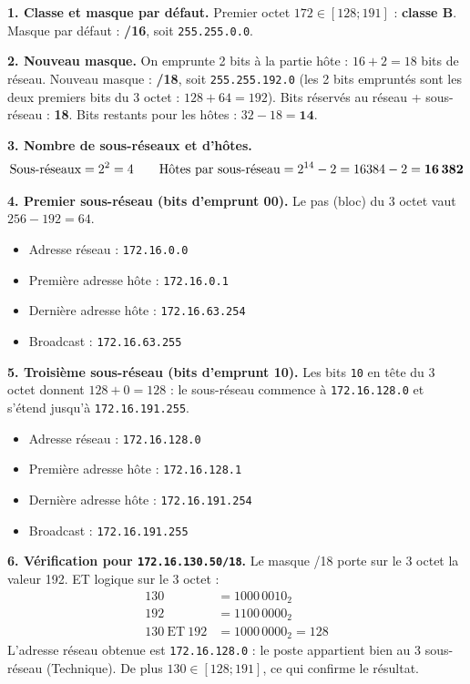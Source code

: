 \documentclass[11pt]{article}
\begin{document}
\begin{corrige}

\textbf{1. Classe et masque par défaut.} Premier octet $172 \in [128 ; 191]$ : \textbf{classe B}. Masque par défaut : \textbf{/16}, soit \texttt{255.255.0.0}.

\textbf{2. Nouveau masque.} On emprunte 2 bits à la partie hôte : $16 + 2 = 18$ bits de réseau. Nouveau masque : \textbf{/18}, soit \texttt{255.255.192.0} (les 2 bits empruntés sont les deux premiers bits du 3 octet : $128 + 64 = 192$). Bits réservés au réseau + sous-réseau : \textbf{18}. Bits restants pour les hôtes : $32 - 18 = \textbf{14}$.

\textbf{3. Nombre de sous-réseaux et d'hôtes.}
\[ \text{Sous-réseaux} = 2^2 = 4 \qquad \text{Hôtes par sous-réseau} = 2^{14} - 2 = 16384 - 2 = \textbf{16\,382} \]

\textbf{4. Premier sous-réseau (bits d'emprunt 00).} Le pas (bloc) du 3 octet vaut $256 - 192 = 64$.
\begin{itemize}
    \item Adresse réseau : \texttt{172.16.0.0}
    \item Première adresse hôte : \texttt{172.16.0.1}
    \item Dernière adresse hôte : \texttt{172.16.63.254}
    \item Broadcast : \texttt{172.16.63.255}
\end{itemize}

\textbf{5. Troisième sous-réseau (bits d'emprunt 10).} Les bits \texttt{10} en tête du 3 octet donnent $128 + 0 = 128$ : le sous-réseau commence à \texttt{172.16.128.0} et s'étend jusqu'à \texttt{172.16.191.255}.
\begin{itemize}
    \item Adresse réseau : \texttt{172.16.128.0}
    \item Première adresse hôte : \texttt{172.16.128.1}
    \item Dernière adresse hôte : \texttt{172.16.191.254}
    \item Broadcast : \texttt{172.16.191.255}
\end{itemize}

\textbf{6. Vérification pour \texttt{172.16.130.50/18}.} Le masque /18 porte sur le 3 octet la valeur 192. ET logique sur le 3 octet :
\begin{align*}
130 &= 1000\,0010_2 \\
192 &= 1100\,0000_2 \\
130 \ \text{ET}\ 192 &= 1000\,0000_2 = 128
\end{align*}
L'adresse réseau obtenue est \texttt{172.16.128.0} : le poste appartient bien au 3 sous-réseau (Technique). De plus $130 \in [128 ; 191]$, ce qui confirme le résultat.


\end{corrige}
\end{document}
